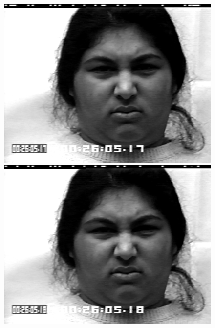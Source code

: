 \documentclass[12pt, a4paper]{report}
\begin{document}
\begin{figure}[h]
\begin{minipage}[b]{.2\linewidth}
		\includegraphics[width=\linewidth]{Bilder/Disgust5.png}
	\end{minipage}
	\hspace{.025\linewidth}%
	\begin{minipage}[b]{.2\linewidth} %
		\includegraphics[width=\linewidth]{Bilder/Disgust6.png}
	\end{minipage}
	\hspace{.025\linewidth}%
	\begin{minipage}[b]{.2\linewidth} %

\end{minipage}
\end{figure}
\end{document}
